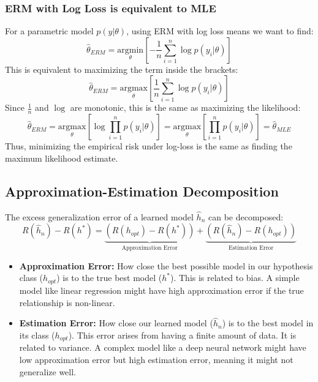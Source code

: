 \documentclass{article}
\begin{document}
\begin{multicols}{2}
\subsubsection{ERM with Log Loss is equivalent to MLE}
For a parametric model $p(y|\theta)$, using ERM with log loss means we want to find:
$$ \hat{\theta}_{ERM} = \underset{\theta}{\text{argmin}} \left[ -\frac{1}{n} \sum_{i=1}^{n} \log p(y_i|\theta) \right] $$
This is equivalent to maximizing the term inside the brackets:
$$ \hat{\theta}_{ERM} = \underset{\theta}{\text{argmax}} \left[ \frac{1}{n} \sum_{i=1}^{n} \log p(y_i|\theta) \right] $$
Since $\frac{1}{n}$ and $\log$ are monotonic, this is the same as maximizing the likelihood:
$$ \hat{\theta}_{ERM} = \underset{\theta}{\text{argmax}} \left[ \log \prod_{i=1}^{n} p(y_i|\theta) \right] = \underset{\theta}{\text{argmax}} \left[ \prod_{i=1}^{n} p(y_i|\theta) \right] = \hat{\theta}_{MLE} $$
Thus, minimizing the empirical risk under log-loss is the same as finding the maximum likelihood estimate.

\subsection{Approximation-Estimation Decomposition}
The excess generalization error of a learned model $\hat{h}_n$ can be decomposed:
$$ R(\hat{h}_n) - R(h^*) = \underbrace{(R(h_{opt}) - R(h^*))}_{\text{Approximation Error}} + \underbrace{(R(\hat{h}_n) - R(h_{opt}))}_{\text{Estimation Error}} $$
\begin{itemize}
    \item \textbf{Approximation Error:} How close the best possible model in our hypothesis class ($h_{opt}$) is to the true best model ($h^*$). This is related to bias. A simple model like linear regression might have high approximation error if the true relationship is non-linear.
    \item \textbf{Estimation Error:} How close our learned model ($\hat{h}_n$) is to the best model in its class ($h_{opt}$). This error arises from having a finite amount of data. It is related to variance. A complex model like a deep neural network might have low approximation error but high estimation error, meaning it might not generalize well.
\end{itemize}


\end{multicols}
\end{document}
